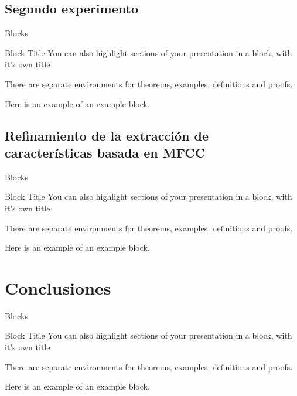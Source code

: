 \documentclass[aspectratio=169]{beamer}
\begin{document}
\subsection{Segundo experimento}

\begin{frame}{Blocks}
\begin{block}{Block Title}
You can also highlight sections of your presentation in a block, with it's own title
\end{block}
\begin{theorem}
There are separate environments for theorems, examples, definitions and proofs.
\end{theorem}
\begin{example}
Here is an example of an example block.
\end{example}
\end{frame}

\subsection{Refinamiento de la extracción de características basada en MFCC}

\begin{frame}{Blocks}
\begin{block}{Block Title}
You can also highlight sections of your presentation in a block, with it's own title
\end{block}
\begin{theorem}
There are separate environments for theorems, examples, definitions and proofs.
\end{theorem}
\begin{example}
Here is an example of an example block.
\end{example}
\end{frame}

\section{Conclusiones}

\begin{frame}{Blocks}
\begin{block}{Block Title}
You can also highlight sections of your presentation in a block, with it's own title
\end{block}
\begin{theorem}
There are separate environments for theorems, examples, definitions and proofs.
\end{theorem}
\begin{example}
Here is an example of an example block.
\end{example}
\end{frame}
\end{document}
